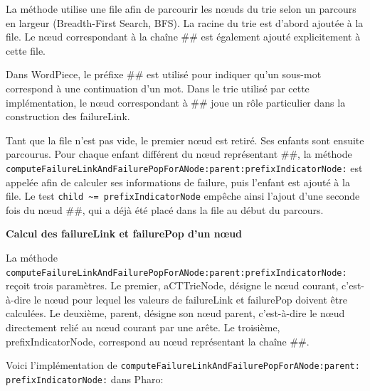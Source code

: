 \documentclass[12pt,a4paper]{report}
\begin{document}
	La méthode utilise une file afin de parcourir les nœuds du trie selon un parcours en largeur (Breadth-First Search, BFS). La racine du trie est d'abord ajoutée à la file. Le nœud correspondant à la chaîne \#\# est également ajouté explicitement à cette file.
	
	Dans WordPiece, le préfixe \#\# est utilisé pour indiquer qu'un sous-mot correspond à une continuation d'un mot. Dans le trie utilisé par cette implémentation, le nœud correspondant à \#\# joue un rôle particulier dans la construction des failureLink.
	
	Tant que la file n'est pas vide, le premier nœud est retiré. Ses enfants sont ensuite parcourus. Pour chaque enfant différent du nœud représentant \#\#, la méthode\\
	\texttt{computeFailureLinkAndFailurePopForANode:parent:prefixIndicatorNode:} est appelée afin de calculer ses informations de failure, puis l'enfant est ajouté à la file. Le test \texttt{child \textasciitilde=  prefixIndicatorNode} empêche ainsi l'ajout d'une seconde fois du nœud \#\#, qui a déjà été placé dans la file au début du parcours.
	
	\textbf{Calcul des failureLink et failurePop d'un nœud}
	
	La méthode \texttt{computeFailureLinkAndFailurePopForANode:parent:prefixIndicatorNode:} reçoit trois paramètres. Le premier, aCTTrieNode, désigne le nœud courant, c'est-à-dire le nœud pour lequel les valeurs de failureLink et failurePop doivent être calculées. Le deuxième, parent, désigne son nœud parent, c'est-à-dire le nœud directement relié au nœud courant par une arête. Le troisième, prefixIndicatorNode, correspond au nœud représentant la chaîne \#\#.
	
	Voici l'implémentation de \texttt{computeFailureLinkAndFailurePopForANode:parent:\\
	prefixIndicatorNode:} dans Pharo:
	
\end{document}
